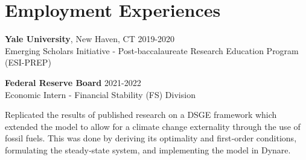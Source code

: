 
\section{Employment Experiences}
\vspace{-0.25in}
\begin{outerlist}
	\item \textbf{Yale University}, New Haven, CT \hfill 2019-2020 \\
	Emerging Scholars Initiative - Post-baccalaureate Research Education Program (ESI-PREP)
	\item \textbf{Federal Reserve Board} \hfill 2021-2022 \\
          Economic Intern - Financial Stability (FS) Division

          \begin{innerlist}
		\item Replicated the results of published research on a DSGE framework which extended the model to allow for a climate change externality through the use of fossil fuels. This was done by deriving its optimality and first‐order conditions, formulating the steady‐state system, and implementing the model in Dynare.
		
	\end{innerlist}
\end{outerlist}
